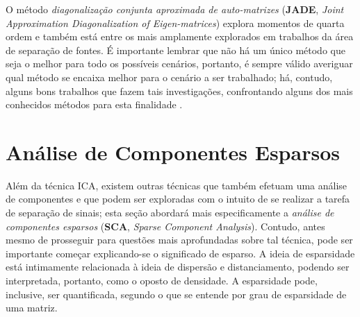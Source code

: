 O método \textit{diagonalização conjunta aproximada de auto-matrizes} (\textbf{JADE}, \textit{Joint Approximation Diagonalization of Eigen-matrices}) \citep{cardoso1999high} explora momentos de quarta ordem e também está entre os mais amplamente explorados em trabalhos da área de separação de fontes. É importante lembrar que não há um único método que seja o melhor para todo os possíveis cenários, portanto, é sempre válido averiguar qual método se encaixa melhor para o cenário a ser trabalhado; há, contudo, alguns bons trabalhos que fazem tais investigações, confrontando alguns dos mais conhecidos métodos para esta finalidade \citep{matic2009comparison, sahonerocomparison}.










\section{Análise de Componentes Esparsos}
\label{sec:bss_sca}

Além da técnica ICA, existem outras técnicas que também efetuam uma análise de componentes e que podem ser exploradas com o intuito de se realizar a tarefa de separação de sinais; esta seção abordará mais especificamente a \textit{análise de componentes esparsos} (\textbf{SCA}, \textit{Sparse Component Analysis}). Contudo, antes mesmo de prosseguir para questões mais aprofundadas sobre tal técnica, pode ser importante começar explicando-se o significado de esparso. A ideia de esparsidade está intimamente relacionada à ideia de dispersão e distanciamento, podendo ser interpretada, portanto, como o oposto de densidade. A esparsidade pode, inclusive, ser quantificada, segundo o que se entende por grau de esparsidade de uma matriz.\\


